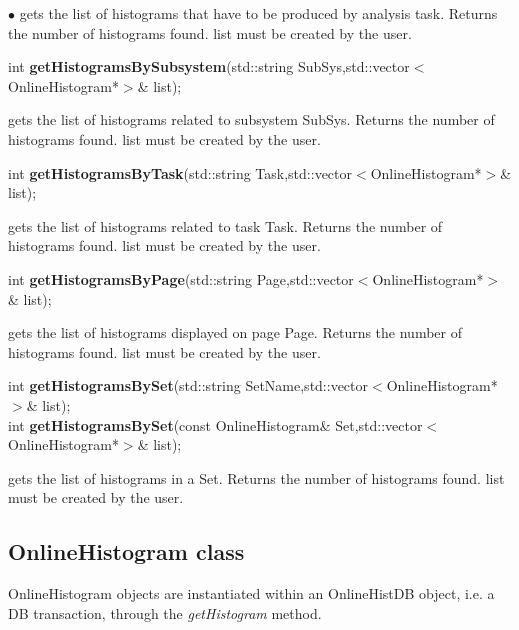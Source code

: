 \documentclass{lhcbnote}
\begin{document}
\begin{list}{$\bullet$}{}
gets the list of histograms that have to be produced by analysis
task. Returns the number of histograms found. list must be
created by the user.

\item int {\bf getHistogramsBySubsystem}(std::string
SubSys,std::vector$<$OnlineHistogram*$>$\& list);

gets the list of histograms related to subsystem SubSys. Returns the
number of histograms found. list must be created by the user.

\item  int {\bf getHistogramsByTask}(std::string
Task,std::vector$<$OnlineHistogram*$>$\& list);

  gets the list of histograms related to task Task. Returns the
number of histograms found. list must be created by the user.

\item  int {\bf getHistogramsByPage}(std::string Page,std::vector$<$OnlineHistogram*$>$\& list);

  gets the list of histograms displayed on page Page. Returns the
number of histograms found. list must be created by the user.

\item  int {\bf getHistogramsBySet}(std::string SetName,std::vector$<$OnlineHistogram*$>$\& list);\\
int {\bf getHistogramsBySet}(const OnlineHistogram\& Set,std::vector$<$OnlineHistogram*$>$\& list);

  gets the list of histograms in a Set. Returns the
number of histograms found. list must be created by the user.

\end{list}


\subsection{OnlineHistogram class}

OnlineHistogram objects are instantiated within an
OnlineHistDB object, i.e. a DB transaction, through the {\it
getHistogram} method.
\end{document}
